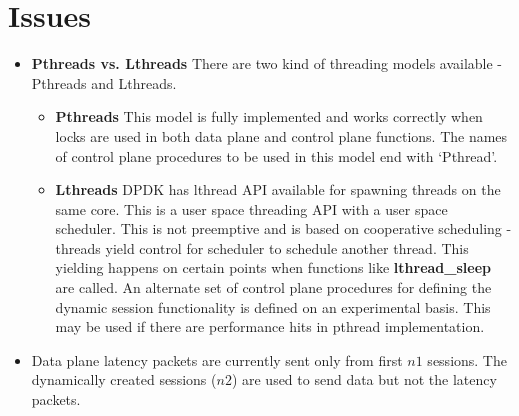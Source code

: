 \section{Issues}
\begin{itemize}
	\item \textbf{Pthreads vs. Lthreads}
	There are two kind of threading models available - Pthreads and Lthreads.
	\begin{itemize}
		\item \textbf{Pthreads} This model is fully implemented and works correctly when locks are used in both data plane and control plane functions. The names of control plane procedures to be used in this model end with `Pthread'.
		\item \textbf{Lthreads} DPDK has lthread API available for spawning threads on the 
		same core. This is a user space threading API with a user space scheduler. This is 
		not preemptive and is based on cooperative scheduling -threads yield control for 
		scheduler to schedule another thread. This yielding happens on certain points when 
		functions like \textbf{lthread\_sleep} are called. An alternate set of control plane procedures for defining the dynamic session functionality is defined on an experimental basis. This may be used if there are performance hits in pthread implementation.
	\end{itemize}
	\item Data plane latency packets are currently sent only from first $n1$ sessions. The dynamically created sessions ($n2$) are used to send data but not the latency packets.
\end{itemize}

